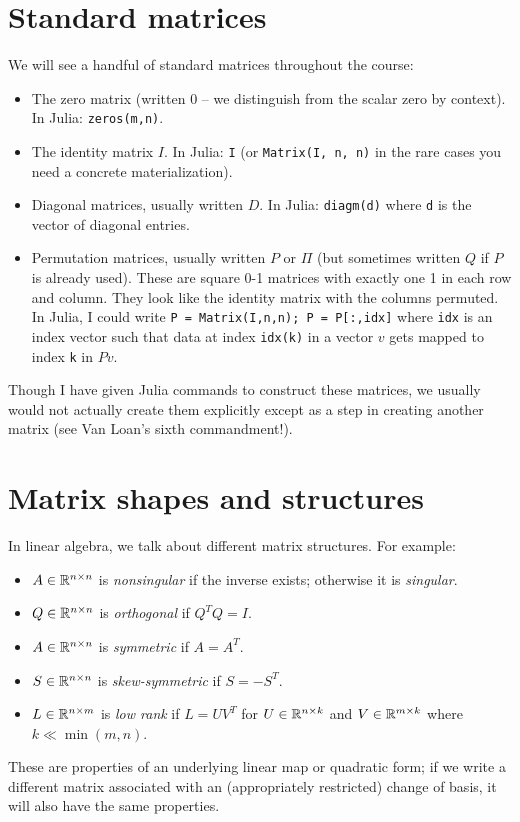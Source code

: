 \documentclass[12pt, leqno]{article}
\begin{document}
\section*{Standard matrices}

We will see a handful of standard matrices throughout the
course:
\begin{itemize}
\item The zero matrix (written $0$ -- we distinguish from the scalar
  zero by context).  In Julia: {\tt zeros(m,n)}.
\item The identity matrix $I$.  In Julia: {\tt I} (or {\tt Matrix(I,
  n, n)} in the rare cases you need a concrete materialization).
\item Diagonal matrices, usually written $D$.  In Julia:
  {\tt diagm(d)} where {\tt d} is the vector of diagonal entries.
\item Permutation matrices, usually written $P$ or $\Pi$ (but
  sometimes written $Q$ if $P$ is already used).  These are square 0-1
  matrices with exactly one 1 in each row and column.  They look like
  the identity matrix with the columns permuted.  In Julia, I could
  write {\tt P = Matrix(I,n,n); P = P[:,idx]} where {\tt idx} is an
  index vector such that data at index {\tt idx(k)} in a vector $v$
  gets mapped to index {\tt k} in $Pv$.
\end{itemize}
Though I have given Julia commands to construct these matrices,
we usually would not actually create them explicitly except as a
step in creating another matrix (see Van Loan's sixth commandment!).

\section{Matrix shapes and structures}

In linear algebra, we talk about different matrix structures.
For example:
\begin{itemize}
\item $A \in \mathbb{R}^{n \times n}$ is {\em nonsingular} if the inverse
  exists; otherwise it is {\em singular}.
\item $Q \in \mathbb{R}^{n \times n}$ is {\em orthogonal} if $Q^T Q = I$.
\item $A \in \mathbb{R}^{n \times n}$ is {\em symmetric} if $A = A^T$.
\item $S \in \mathbb{R}^{n \times n}$ is {\em skew-symmetric} if $S = -S^T$.
\item $L \in \mathbb{R}^{n \times m}$ is {\em low rank} if $L = UV^T$
  for $U \in \mathbb{R}^{n \times k}$ and $V \in \mathbb{R}^{m \times k}$ where
  $k \ll \min(m,n)$.
\end{itemize}
These are properties of an underlying linear map or quadratic form; if
we write a different matrix associated with an (appropriately
restricted) change of basis, it will also have the same properties.
\end{document}
